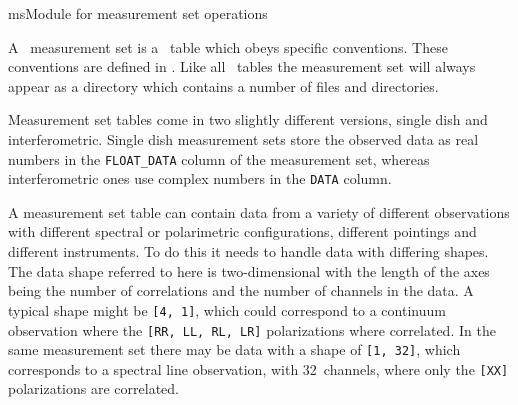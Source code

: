 \providecommand{\dataSelectionURL}{http://almasw.hq.eso.org/almasw/bin/view/OFFLINE/DataSelection}
\begin{ahmodule}{ms}{Module for measurement set operations}

\begin{ahdescription}
  A \casa\ measurement set is a \casa\ table which obeys
  specific conventions. These conventions are defined in
  . Like all
  \casa\ tables the measurement set will always appear as a
  directory which contains a number of files and directories.

  Measurement set tables come in two slightly different versions,
  single dish and interferometric. Single dish measurement sets
  store the observed data as real numbers in the \verb|FLOAT_DATA|
  column of the measurement set, whereas interferometric ones use
  complex numbers in the \verb|DATA| column.

  A measurement set table can contain data from a variety of
  different observations with different spectral or polarimetric
  configurations, different pointings and different instruments. To
  do this it needs to handle data with differing shapes. The data
  shape referred to here is two-dimensional with the length of the
  axes being the number of correlations and the number of channels
  in the data. A typical shape might be \verb|[4, 1]|, which could
  correspond to a continuum observation where the
  \verb|[RR, LL, RL, LR]| polarizations where correlated. In the
  same measurement set there may be data with a shape of
  \verb|[1, 32]|, which corresponds to a spectral line observation,
  with 32~channels, where only the \verb|[XX]| polarizations are
  correlated.

\end{ahdescription}

\ahobjs{}
\ahfuncs{}




\end{ahmodule}
